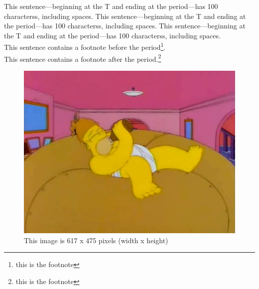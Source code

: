 \documentclass[utf8]{my_class_1_front_vanc}  %
\begin{document}
This sentence---beginning at the T and ending at the period---has 100 characterss, including spaces.\cite{article}
This sentence---beginning at the T and ending at the period---has 100 characterss, including spaces.\cite{book}
This sentence---beginning at the T and ending at the period---has 100 characterss, including spaces.\\
This sentence contains a footnote before the period\footnote{this is the footnote}.\\
This sentence contains a footnote after the period.\footnote{this is the footnote}


\begin{figure}[htbp]
        \begin{center}
        \includegraphics[width=\linewidth]{homer_giant_donut.jpg}
        \end{center}
    \caption{ This image is 617 x 475 pixels (width x height) }\label{fig:homer_giant_donut}
\end{figure}

\end{document}
